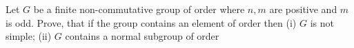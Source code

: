 Let  $ G$ be a finite non-commutative group of order  where $ n, m$ are positive and $ m$ is odd. Prove, that if the group contains an element of order  then
(i) $ G$ is not simple;
(ii) $ G$ contains a normal subgroup of order 